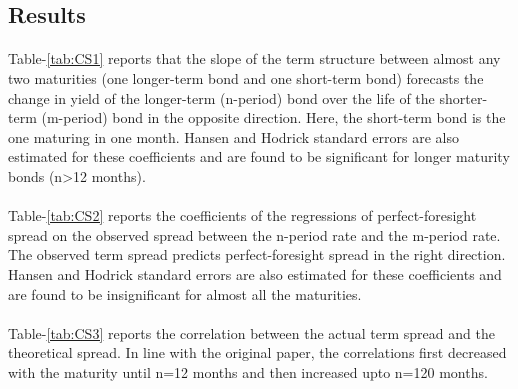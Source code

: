 \documentclass[11pt]{article}
\begin{document}
\subsection{Results}
\paragraph{} Table-\ref{tab:CS1} reports that the slope of the term structure between almost any two maturities (one longer-term bond and one short-term bond)
forecasts the change in yield of the longer-term (n-period)
bond over the life of the shorter-term (m-period) bond in the opposite direction. Here, the short-term bond is the one maturing in one month. Hansen and Hodrick standard errors are also estimated for these coefficients and are found to be significant for longer maturity bonds (n>12 months).

\paragraph{} Table-\ref{tab:CS2} reports the coefficients of the regressions of perfect-foresight spread on the observed spread between the n-period rate and the m-period rate. The observed term spread predicts perfect-foresight spread in the right direction. Hansen and Hodrick standard errors are also estimated for these coefficients and are found to be insignificant for almost all the maturities.

\paragraph{} Table-\ref{tab:CS3} reports the correlation between the actual term spread and the theoretical spread. In line with the original paper, the correlations first decreased with the maturity until n=12 months and then increased upto n=120 months.
\end{document}
